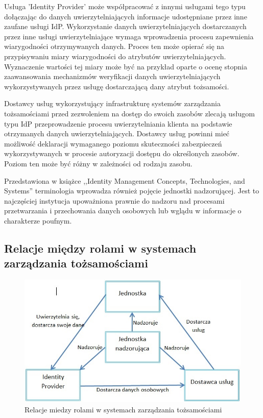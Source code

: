 		Usługa 'Identity Provider' może współpracować z innymi usługami tego typu dołączając do danych uwierzytelniających informacje udostępniane przez inne zaufane usługi IdP. Wykorzystanie danych uwierzytelniających dostarczanych przez inne usługi uwierzytelniające wymaga wprowadzenia procesu zapewnienia wiarygodności otrzymywanych danych. Proces ten może opierać się na przypisywaniu miary wiarygodności do atrybutów uwierzytelniających. Wyznaczenie wartości tej miary może być na przykład oparte o ocenę stopnia zaawansowania mechanizmów weryfikacji danych uwierzytelniających wykorzystywanych przez usługę dostarczającą dany atrybut tożsamości.

		Dostawcy usług wykorzystujący infrastrukturę systemów zarządzania tożsamościami przed zezwoleniem na dostęp do swoich zasobów zlecają usługom typu IdP przeprowadzenie procesu uwierzytelniania klienta na podstawie otrzymanych danych uwierzytelniających. Dostawcy usług powinni mieć możliwość deklaracji wymaganego poziomu skuteczności zabezpieczeń wykorzystywanych w procesie autoryzacji dostępu do określonych zasobów. Poziom ten może być różny w zależności od rodzaju zasobu.

		Przedstawiona w książce ,,Identity Management Concepts, Technologies, and Systems'' terminologia wprowadza również pojęcie jednostki nadzorującej\cite{Bertino11}. Jest to najczęściej instytucja upoważniona prawnie do nadzoru nad procesami przetwarzania i przechowania danych osobowych lub wglądu  w informacje o charakterze poufnym.

	\subsection{Relacje między rolami w systemach zarządzania tożsamościami}

		\begin{figure}[h]
			\centering
			\includegraphics[width=15cm]{img/idmRelations.jpg}
			\caption{Relacje miedzy rolami w systemach zarządzania tożsamościami}
			\label{Relacje miedzy rolami w systemach zarządzania tożsamościami}
		\end{figure}

